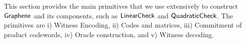 This section provides the main primitives that we use extensively to construct $\textsf{Graphene}$ and its components, such as $\mathsf{LinearCheck}$ and $\mathsf{QuadraticCheck}$. The primitives are i) Witness Encoding, ii) Codes and matrices, iii) Commitment of product codewords, iv) Oracle construction, and v) Witness decoding.

